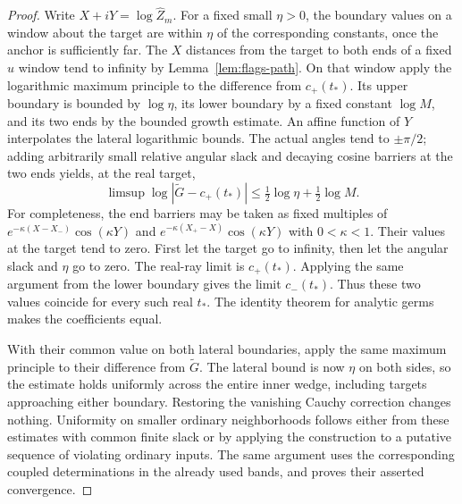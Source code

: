 \begin{proof}
Write $X+iY=\log\widehat Z_m$.  For a fixed small $\eta>0$,
the boundary values on a window about the target are within
$\eta$ of the corresponding constants, once the anchor is
sufficiently far.  The $X$ distances from the target to both
ends of a fixed $u$ window tend to infinity by
Lemma~\ref{lem:flags-path}.  On that window apply the logarithmic
maximum principle to the difference from $c_+(t_*)$.
Its upper boundary is bounded by $\log\eta$, its lower
boundary by a fixed constant $\log M$, and its two ends by
the bounded growth estimate.  An affine function of $Y$
interpolates the lateral logarithmic bounds.  The actual angles
tend to $\pm\pi/2$; adding arbitrarily small relative angular
slack and decaying cosine barriers at the two ends yields, at
the real target,
\[
 \limsup\log|\widetilde G-c_+(t_*)|
       \leq\tfrac12\log\eta+\tfrac12\log M.
\]
For completeness, the end barriers may be taken as fixed
multiples of
$e^{-\kappa(X-X_-)}\cos(\kappa Y)$ and
$e^{-\kappa(X_+-X)}\cos(\kappa Y)$ with $0<\kappa<1$.
Their values at the target tend to zero.  First let the target
go to infinity, then let the angular slack and $\eta$ go to
zero.  The real-ray limit is $c_+(t_*)$.  Applying the same
argument from the lower boundary gives the limit $c_-(t_*)$.
Thus these two values coincide for every such real $t_*$.
The identity theorem for analytic germs makes the coefficients
equal.

With their common value on both lateral boundaries, apply the
same maximum principle to their difference from $\widetilde G$.
The lateral bound is now $\eta$ on both sides, so the estimate
holds uniformly across the entire inner wedge, including
targets approaching either boundary.  Restoring the vanishing
Cauchy correction changes nothing.  Uniformity on smaller
ordinary neighborhoods follows either from these estimates
with common finite slack or by applying the construction to
a putative sequence of violating ordinary inputs.  The same
argument uses the corresponding coupled determinations in the
already used bands, and proves their asserted convergence.
\end{proof}

